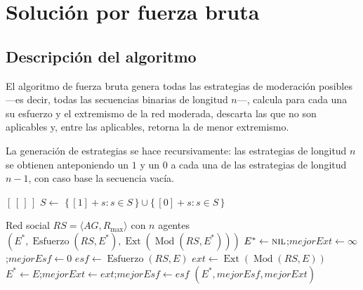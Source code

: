\documentclass[11pt,letterpaper]{article}
\newcommand{\RS}{\mathit{RS}}
\newcommand{\Rmax}{R_{\max}}
\newcommand{\Ext}{\operatorname{Ext}}
\newcommand{\Esf}{\operatorname{Esfuerzo}}
\newcommand{\Mod}{\operatorname{Mod}}
\begin{document}
\section{Solución por fuerza bruta}
\label{sec:fb}

\subsection{Descripción del algoritmo}

El algoritmo de fuerza bruta genera todas las estrategias de moderación
posibles ---es decir, todas las secuencias binarias de longitud $n$---, calcula
para cada una su esfuerzo y el extremismo de la red moderada, descarta las que
no son aplicables y, entre las aplicables, retorna la de menor extremismo.

La generación de estrategias se hace recursivamente: las estrategias de
longitud $n$ se obtienen anteponiendo un $1$ y un $0$ a cada una de las
estrategias de longitud $n-1$, con caso base la secuencia vacía.

\begin{algorithm}[H]
  \caption{Generación de todas las estrategias}
  \label{alg:generar}
  \begin{algorithmic}[1]
        \State \Return $[\,[\,]\,]$
      \EndIf
      \State $S \gets$ 
      \State \Return $\{\, [1] + s : s \in S \,\} \cup \{\, [0] + s : s \in S \,\}$
    \EndFunction
  \end{algorithmic}
\end{algorithm}

\begin{algorithm}[H]
  \caption{ModEx por fuerza bruta}
  \label{alg:fb}
  \begin{algorithmic}[1]
    \Require Red social $\RS = \langle AG, \Rmax \rangle$ con $n$ agentes
    \Ensure $(E^*, \Esf(\RS,E^*), \Ext(\Mod(\RS,E^*)))$
    \State $E^* \gets \textsc{nil}$;\quad $\mathit{mejorExt} \gets \infty$;\quad $\mathit{mejorEsf} \gets 0$
      \State $\mathit{esf} \gets \Esf(\RS, E)$
      \State $\mathit{ext} \gets \Ext(\Mod(\RS, E))$
      \If{$\mathit{esf} \le \Rmax$ \textbf{and} $\mathit{ext} < \mathit{mejorExt}$}
        \State $E^* \gets E$;\quad $\mathit{mejorExt} \gets \mathit{ext}$;\quad $\mathit{mejorEsf} \gets \mathit{esf}$
      \EndIf
    \EndFor
    \State \Return $(E^*, \mathit{mejorEsf}, \mathit{mejorExt})$
  \end{algorithmic}
\end{algorithm}
\end{document}
